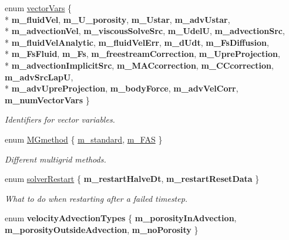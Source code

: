 \begin{DoxyCompactItemize}
enum \hyperlink{class_a_m_r_level_mushy_layer_ac7a25361b1895a85f5916a1adfd3153b}{vector\-Vars} \{ \\*
{\bfseries m\-\_\-fluid\-Vel}, 
{\bfseries m\-\_\-\-U\-\_\-porosity}, 
{\bfseries m\-\_\-\-Ustar}, 
{\bfseries m\-\_\-adv\-Ustar}, 
\\*
{\bfseries m\-\_\-advection\-Vel}, 
{\bfseries m\-\_\-viscous\-Solve\-Src}, 
{\bfseries m\-\_\-\-Udel\-U}, 
{\bfseries m\-\_\-advection\-Src}, 
\\*
{\bfseries m\-\_\-fluid\-Vel\-Analytic}, 
{\bfseries m\-\_\-fluid\-Vel\-Err}, 
{\bfseries m\-\_\-d\-Udt}, 
{\bfseries m\-\_\-\-Fs\-Diffusion}, 
\\*
{\bfseries m\-\_\-\-Fs\-Fluid}, 
{\bfseries m\-\_\-\-Fs}, 
{\bfseries m\-\_\-freestream\-Correction}, 
{\bfseries m\-\_\-\-Upre\-Projection}, 
\\*
{\bfseries m\-\_\-advection\-Implicit\-Src}, 
{\bfseries m\-\_\-\-M\-A\-Ccorrection}, 
{\bfseries m\-\_\-\-C\-Ccorrection}, 
{\bfseries m\-\_\-adv\-Src\-Lap\-U}, 
\\*
{\bfseries m\-\_\-adv\-Upre\-Projection}, 
{\bfseries m\-\_\-body\-Force}, 
{\bfseries m\-\_\-adv\-Vel\-Corr}, 
{\bfseries m\-\_\-num\-Vector\-Vars}
 \}
\begin{DoxyCompactList}\small\item\em Identifiers for vector variables. \end{DoxyCompactList}\item 
enum \hyperlink{class_a_m_r_level_mushy_layer_ac96810ce869ac7ad58404b43a823cba3}{M\-Gmethod} \{ \hyperlink{class_a_m_r_level_mushy_layer_ac96810ce869ac7ad58404b43a823cba3a7fcd73cadaa66126997b4e1183712951}{m\-\_\-standard}, 
\hyperlink{class_a_m_r_level_mushy_layer_ac96810ce869ac7ad58404b43a823cba3a2b0b946b439cf26fb2ee3648f4ea7744}{m\-\_\-\-F\-A\-S}
 \}
\begin{DoxyCompactList}\small\item\em Different multigrid methods. \end{DoxyCompactList}\item 
enum \hyperlink{class_a_m_r_level_mushy_layer_ae580be53bf92a5bad64ba0032282458b}{solver\-Restart} \{ {\bfseries m\-\_\-restart\-Halve\-Dt}, 
{\bfseries m\-\_\-restart\-Reset\-Data}
 \}
\begin{DoxyCompactList}\small\item\em What to do when restarting after a failed timestep. \end{DoxyCompactList}\item 
enum {\bfseries velocity\-Advection\-Types} \{ {\bfseries m\-\_\-porosity\-In\-Advection}, 
{\bfseries m\-\_\-porosity\-Outside\-Advection}, 
{\bfseries m\-\_\-no\-Porosity}
 \}
\end{DoxyCompactItemize}
